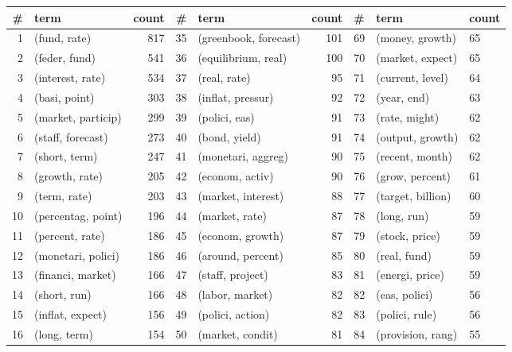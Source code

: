 \begin{tabular}{rlrrlrlll}
\toprule
  \# &                term & count &   \# &                   term & count &    \# &                  term & count \\
\midrule
  1 &        (fund, rate) &   817 &  35 &  (greenbook, forecast) &   101 &   69 &       (money, growth) &    65 \\
  2 &       (feder, fund) &   541 &  36 &    (equilibrium, real) &   100 &   70 &      (market, expect) &    65 \\
  3 &    (interest, rate) &   534 &  37 &           (real, rate) &    95 &   71 &      (current, level) &    64 \\
  4 &       (basi, point) &   303 &  38 &      (inflat, pressur) &    92 &   72 &           (year, end) &    63 \\
  5 &  (market, particip) &   299 &  39 &          (polici, eas) &    91 &   73 &         (rate, might) &    62 \\
  6 &   (staff, forecast) &   273 &  40 &          (bond, yield) &    91 &   74 &      (output, growth) &    62 \\
  7 &       (short, term) &   247 &  41 &     (monetari, aggreg) &    90 &   75 &       (recent, month) &    62 \\
  8 &      (growth, rate) &   205 &  42 &        (econom, activ) &    90 &   76 &       (grow, percent) &    61 \\
  9 &        (term, rate) &   203 &  43 &     (market, interest) &    88 &   77 &     (target, billion) &    60 \\
 10 &  (percentag, point) &   196 &  44 &         (market, rate) &    87 &   78 &           (long, run) &    59 \\
 11 &     (percent, rate) &   186 &  45 &       (econom, growth) &    87 &   79 &        (stock, price) &    59 \\
 12 &  (monetari, polici) &   186 &  46 &      (around, percent) &    85 &   80 &          (real, fund) &    59 \\
 13 &   (financi, market) &   166 &  47 &       (staff, project) &    83 &   81 &       (energi, price) &    59 \\
 14 &        (short, run) &   166 &  48 &        (labor, market) &    82 &   82 &         (eas, polici) &    56 \\
 15 &    (inflat, expect) &   156 &  49 &       (polici, action) &    82 &   83 &        (polici, rule) &    56 \\
 16 &        (long, term) &   154 &  50 &       (market, condit) &    81 &   84 &     (provision, rang) &    55 \\

\end{tabular}
